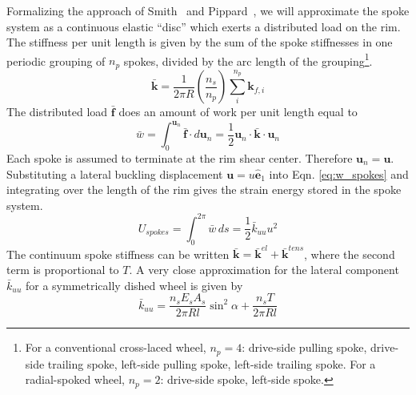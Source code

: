 \documentclass{bmd2016p}
\newcommand{\e}{\ensuremath{\hat{\bm{e}}_1}}
\begin{document}
Formalizing the approach of Smith~\cite{Smith1901a} and Pippard~\cite{Pippard1932d}, we will approximate the spoke system as a continuous elastic ``disc'' which exerts a distributed load on the rim. The stiffness per unit length is given by the sum of the spoke stiffnesses in one periodic grouping of $n_p$ spokes, divided by the arc length of the grouping\footnote{For a conventional cross-laced wheel, $n_p=4$: drive-side pulling spoke, drive-side trailing spoke, left-side pulling spoke, left-side trailing spoke. For a radial-spoked wheel, $n_p=2$: drive-side spoke, left-side spoke.}.
	\begin{equation}\label{eq:kbar}
	\bar{\bm{k}} = \frac{1}{2\pi R}\left(\frac{n_s}{n_p}\right) \sum_i^{n_p} \bm{k}_{f, i}
	\end{equation}
	The distributed load $\bar{\bm{f}}$ does an amount of work per unit length equal to
	\begin{equation}\label{eq:w_spokes}
	\bar{w} = \int_0^{\bm{u}_n} \bar{\bm{f}} \cdot d\bm{u}_n = \frac{1}{2} \bm{u}_n \cdot \bar{\bm{k}} \cdot \bm{u}_n
	\end{equation}
Each spoke is assumed to terminate at the rim shear center. Therefore $\bm{u}_n = \bm{u}$. Substituting a lateral buckling displacement $\bm{u}=u\e$ into Eqn. \ref{eq:w_spokes} and integrating over the length of the rim gives the strain energy stored in the spoke system.
	\begin{equation}\label{eq:Us}
	U_{spokes} = \int_0^{2\pi} \bar{w} \, ds = \frac{1}{2} \bar{k}_{uu}u^2
	\end{equation}
The continuum spoke stiffness can be written $\bar{\bm{k}} = \bar{\bm{k}}^{el} + \bar{\bm{k}}^{tens}$, where the second term is proportional to $T$. A very close approximation for the lateral component $\bar{k}_{uu}$ for a symmetrically dished wheel is given by
	\begin{equation}\label{eq:kuu}
	\bar{k}_{uu} = \frac{n_sE_sA_s}{2\pi Rl}\sin^2{\alpha} + \frac{n_s T}{2\pi Rl}
	\end{equation}
\end{document}
